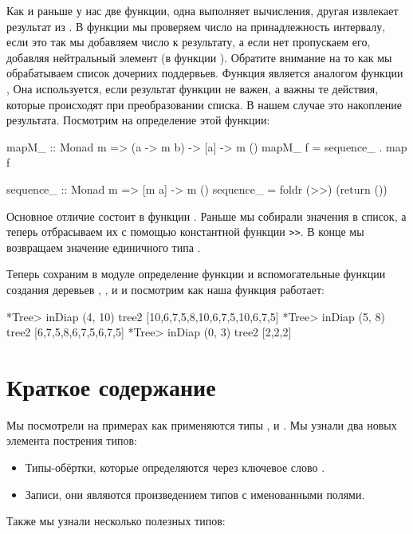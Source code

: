 Как и раньше у нас две функции, одна выполняет вычисления,
другая извлекает результат из . В функции 
 мы проверяем число на принадлежность интервалу, если
это так мы добавляем число к результату, а если нет пропускаем
его, добавляя нейтральный элемент (в функции ). 
Обратите внимание на то как мы обрабатываем список дочерних 
поддервьев. Функция  является аналогом функции ,
Она используется, если результат функции не важен, а важны
те действия, которые происходят при преобразовании списка.
В нашем случае это накопление результата. Посмотрим на определение
этой функции:

\begin{code}
mapM_ :: Monad m => (a -> m b) ->  [a] -> m ()
mapM_ f = sequence_ . map f

sequence_ :: Monad m => [m a] -> m ()
sequence_ = foldr (>>) (return ())
\end{code}

Основное отличие состоит в функции . Раньше
мы собирали значения в список, а теперь отбрасываем их
с помощью константной функции \verb!>>!. В конце мы возвращаем
значение единичного типа \In{()}. 

Теперь сохраним в модуле  определение функции и
вспомогательные функции создания деревьев , ,
и  и посмотрим как наша функция работает:

\begin{code}
*Tree> inDiap (4, 10) tree2
[10,6,7,5,8,10,6,7,5,10,6,7,5]
*Tree> inDiap (5, 8) tree2
[6,7,5,8,6,7,5,6,7,5]
*Tree> inDiap (0, 3) tree2
[2,2,2]
\end{code}

\section{Краткое содержание}

Мы посмотрели на примерах как применяются типы ,
 и . Мы узнали два новых элемента пострения типов:

\begin{itemize}
\item Типы-обёртки, которые определяются через ключевое слово .

\item Записи, они являются произведением типов с именованными полями.
\end{itemize}


Также мы узнали несколько полезных типов:

